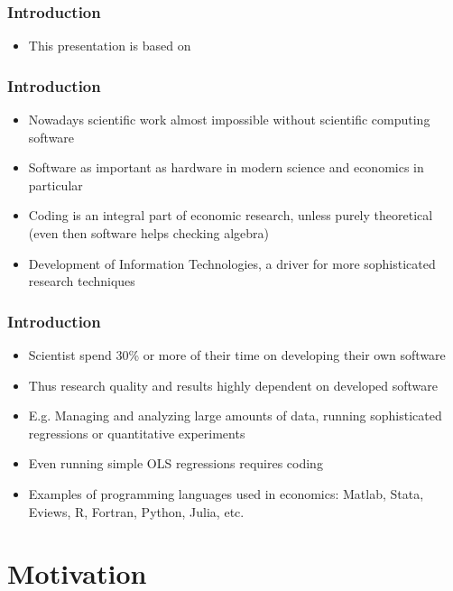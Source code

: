 \documentclass{beamer}
\begin{document}
\begin{frame}
\frametitle{Introduction}
\begin{itemize}
\item This presentation is based on 

\end{itemize}
\end{frame}
\begin{frame}
\frametitle{Introduction}
\begin{itemize}
\item Nowadays scientific work almost impossible without scientific computing software
\item Software as important as hardware in modern science and economics in particular
\item Coding is an integral part of economic research, unless purely theoretical (even then software helps checking algebra)
\item Development of Information Technologies, a driver for more sophisticated research techniques
\end{itemize}
\end{frame}

\begin{frame}
\frametitle{Introduction}
\begin{itemize}
\item Scientist spend 30\% or more of their time on developing their own software \parencite{Hannayetal2009,Prabhuetal2011}
\item Thus research quality and results highly dependent on developed software
\item E.g. Managing and analyzing large amounts of data, running sophisticated regressions or quantitative experiments
\item Even running simple OLS regressions requires coding
\item Examples of programming languages used in economics: Matlab, Stata, Eviews, R, Fortran, Python, Julia, etc.
\end{itemize}
\end{frame}
\section{Motivation}
\end{document}
